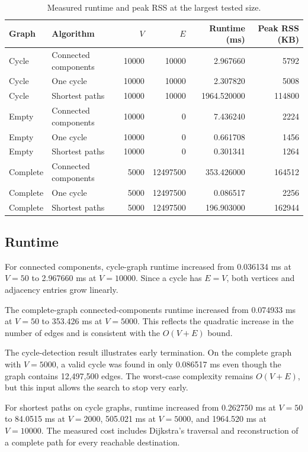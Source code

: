 \documentclass[11pt]{article}
\begin{document}
\begin{table}[ht]
\centering
\caption{Measured runtime and peak RSS at the largest tested size.}
\label{tab:largest}
\small
\begin{tabular}{llrrrr}
\toprule
Graph & Algorithm & $V$ & $E$ & Runtime (ms) & Peak RSS (KB)\\
\midrule
Cycle & Connected components & 10000 & 10000 & 2.967660 & 5792\\
Cycle & One cycle & 10000 & 10000 & 2.307820 & 5008\\
Cycle & Shortest paths & 10000 & 10000 & 1964.520000 & 114800\\
Empty & Connected components & 10000 & 0 & 7.436240 & 2224\\
Empty & One cycle & 10000 & 0 & 0.661708 & 1456\\
Empty & Shortest paths & 10000 & 0 & 0.301341 & 1264\\
Complete & Connected components & 5000 & 12497500 & 353.426000 & 164512\\
Complete & One cycle & 5000 & 12497500 & 0.086517 & 2256\\
Complete & Shortest paths & 5000 & 12497500 & 196.903000 & 162944\\
\bottomrule
\end{tabular}
\end{table}

\subsection{Runtime}

For connected components, cycle-graph runtime increased from 0.036134 ms at
$V=50$ to 2.967660 ms at $V=10000$. Since a cycle has $E=V$, both vertices
and adjacency entries grow linearly.

The complete-graph connected-components runtime increased from 0.074933 ms at
$V=50$ to 353.426 ms at $V=5000$. This reflects the quadratic increase in
the number of edges and is consistent with the $O(V+E)$ bound.

The cycle-detection result illustrates early termination. On the complete
graph with $V=5000$, a valid cycle was found in only 0.086517 ms even though
the graph contains 12,497,500 edges. The worst-case complexity remains
$O(V+E)$, but this input allows the search to stop very early.

For shortest paths on cycle graphs, runtime increased from 0.262750 ms at
$V=50$ to 84.0515 ms at $V=2000$, 505.021 ms at $V=5000$, and
1964.520 ms at $V=10000$. The measured cost includes Dijkstra's traversal
and reconstruction of a complete path for every reachable destination.
\end{document}
